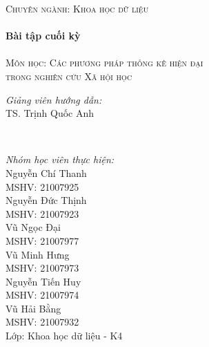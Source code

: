 \documentclass[14pt, a4paper]{article}
\numberwithin{equation}{section}
\numberwithin{figure}{section}
\theoremstyle{sltheorem}
\theoremstyle{soltheorem}
\begin{document}
\begin{titlepage}
    \textsc{\Large Chuyên ngành: Khoa học dữ liệu}\\[0.5cm] %



    \HRule \\[0.4cm]
    { \huge \bfseries Bài tập cuối kỳ}\\[0.4cm] %
    \HRule \\[1.5cm]

    \textsc{\Large Môn học: Các phương pháp thống kê hiện đại \\ trong nghiên cứu Xã hội học}\\[1cm] %



    \begin{minipage}{0.4\textwidth}
        \begin{flushleft} \large
            \emph{Giảng viên hướng dẫn:} \\
            TS. Trịnh Quốc Anh %
        \end{flushleft}
    \end{minipage}\\[0.5cm]

    \begin{minipage}{0.4\textwidth}
        \begin{flushleft} \small
            \emph{Nhóm học viên thực hiện:}\\
            Nguyễn Chí Thanh \\
            MSHV: 21007925 \\ %
            Nguyễn Đức Thịnh \\
            MSHV: 21007923 \\
            Vũ Ngọc Đại \\
            MSHV: 21007977 \\
            Vũ Minh Hưng \\
            MSHV: 21007973 \\
            Nguyễn Tiến Huy \\
            MSHV: 21007974\\
            Vũ Hải Bằng \\
            MSHV: 21007932\\
            Lớp: Khoa học dữ liệu - K4
        \end{flushleft}
    \end{minipage}



\end{titlepage}
\end{document}
